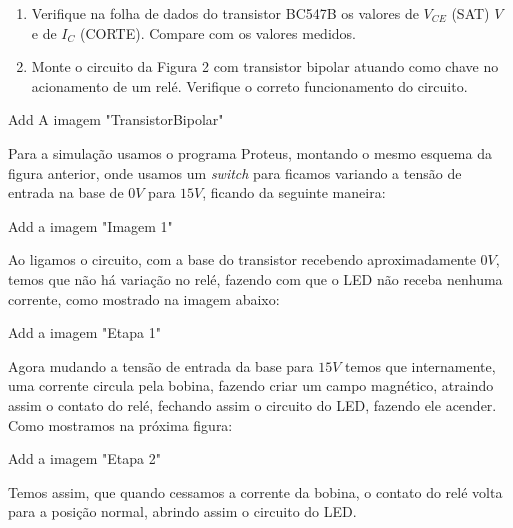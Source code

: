 \begin{enumerate}
	\item Verifique na folha de dados do transistor BC547B os valores de $ V_{CE} $ (SAT) $ V $ e de $ I_C $ (CORTE). Compare com os valores medidos.




	\item Monte o circuito da Figura 2 com transistor bipolar atuando como chave no acionamento de um relé. Verifique o correto funcionamento do circuito.
\end{enumerate}

	
	Add A imagem "TransistorBipolar"
	
Para a simulação usamos o programa Proteus, montando o mesmo esquema da figura anterior, onde usamos um \textit{switch}  para ficamos variando a tensão de entrada na base de $ 0 V $ para $ 15 V $, ficando da seguinte maneira:

	Add a imagem "Imagem 1"

Ao ligamos o circuito, com a base do transistor recebendo aproximadamente $ 0 V $, temos que não há variação no relé, fazendo com que o LED não receba nenhuma corrente, como mostrado na imagem abaixo:

	Add a imagem "Etapa 1"
	
Agora mudando a tensão de entrada da base para $ 15 V $ temos que internamente, uma corrente circula pela bobina, fazendo criar um campo magnético, atraindo assim o contato do relé, fechando assim o circuito do LED, fazendo ele acender. Como mostramos na próxima figura:

	Add a imagem "Etapa 2"
	
Temos assim, que quando cessamos a corrente da bobina, o contato do relé volta para a posição normal, abrindo assim o circuito do LED.

	
	

